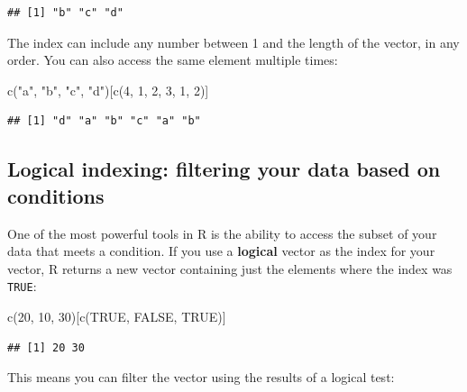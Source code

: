 \documentclass[
]{book}
\newenvironment{Shaded}{\begin{snugshade}}{\end{snugshade}}
\newcommand{\ConstantTok}[1]{\textcolor[rgb]{0.00,0.00,0.00}{#1}}
\newcommand{\DecValTok}[1]{\textcolor[rgb]{0.00,0.00,0.81}{#1}}
\newcommand{\FunctionTok}[1]{\textcolor[rgb]{0.00,0.00,0.00}{#1}}
\newcommand{\NormalTok}[1]{#1}
\newcommand{\StringTok}[1]{\textcolor[rgb]{0.31,0.60,0.02}{#1}}
\begin{document}
\begin{verbatim}
## [1] "b" "c" "d"
\end{verbatim}

The index can include any number between 1 and the length
of the vector, in any order. You can also access the same
element multiple times:

\begin{Shaded}
\begin{Highlighting}[]
\FunctionTok{c}\NormalTok{(}\StringTok{"a"}\NormalTok{, }\StringTok{"b"}\NormalTok{, }\StringTok{"c"}\NormalTok{, }\StringTok{"d"}\NormalTok{)[}\FunctionTok{c}\NormalTok{(}\DecValTok{4}\NormalTok{, }\DecValTok{1}\NormalTok{, }\DecValTok{2}\NormalTok{, }\DecValTok{3}\NormalTok{, }\DecValTok{1}\NormalTok{, }\DecValTok{2}\NormalTok{)]}
\end{Highlighting}
\end{Shaded}

\begin{verbatim}
## [1] "d" "a" "b" "c" "a" "b"
\end{verbatim}

\hypertarget{logical-indexing-filtering-your-data-based-on-conditions}{%
\subsection{Logical indexing: filtering your data based on conditions}\label{logical-indexing-filtering-your-data-based-on-conditions}}

One of the most powerful tools in R is the ability to
access the subset of your data that meets a condition.
If you use a \textbf{logical} vector as the index for
your vector, R returns a new vector containing just the elements
where the index was \texttt{TRUE}:

\begin{Shaded}
\begin{Highlighting}[]
\FunctionTok{c}\NormalTok{(}\DecValTok{20}\NormalTok{, }\DecValTok{10}\NormalTok{, }\DecValTok{30}\NormalTok{)[}\FunctionTok{c}\NormalTok{(}\ConstantTok{TRUE}\NormalTok{, }\ConstantTok{FALSE}\NormalTok{, }\ConstantTok{TRUE}\NormalTok{)]}
\end{Highlighting}
\end{Shaded}

\begin{verbatim}
## [1] 20 30
\end{verbatim}

This means you can filter the vector using the results of a logical
test:
\end{document}
